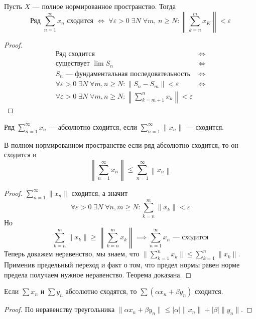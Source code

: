 \begin{theorem}
  Пусть $X$ --- полное нормированное пространство. Тогда
  \begin{equation*}
    \text{Ряд }\sum\limits_{n = 1}^{\infty} x_n\text{ сходится }\iff \; \forall \varepsilon > 0 \; \exists N \; \forall m,\, n \geq N\colon
    \left \|\sum\limits_{k = n}^{m} x_K \right \| < \varepsilon
  \end{equation*}
\end{theorem}
\begin{proof}
  \begin{align*}
    \text{Ряд сходится } &\iff \\
    \text{существует }\lim S_n &\iff \\
    S_n\text{ --- фундаментальная последовательность } &\iff \\
    \forall \varepsilon > 0 \; \exists N \; \forall m, n \geq N\colon \|S_n - S_m\| < \varepsilon &\iff \\
    \forall \varepsilon > 0 \; \exists N \; \forall m, n \geq N\colon
    \left\|\sum\limits_{k = m + 1}^{n} x_k\right\| < \varepsilon&
  \end{align*}
\end{proof}

\begin{conj}
  Ряд $\sum\limits_{n = 1}^{\infty} x_n$ --- абсолютно сходится, если
  $\sum\limits_{n = 1}^{\infty} \|x_n\|$ --- сходится.
\end{conj}

\begin{theorem}
  В полном нормированном пространстве если ряд абсолютно сходится, то он сходится и
  \begin{equation*}
    \left\|\sum\limits_{n = 1}^{\infty} x_n\right\| \leq
    \sum\limits_{n = 1}^{\infty}\left\|x_n\right\|
  \end{equation*}
\end{theorem}
\begin{proof}
  $\sum\limits_{n = 1}^{\infty}\|x_n\|$ сходится, а значит
  \begin{equation*}
    \forall \varepsilon > 0 \; \exists N \; \forall n, m \geq N\colon \sum\limits_{k = n}^{m} \|x_k\| < \varepsilon
  \end{equation*}
  Но
  \begin{equation*}
    \sum\limits_{k = n}^{m} \| x_k \| \geq \left\| \sum\limits_{k = n}^{m} x_k \right\| \implies
  \sum\limits_{n = 1}^{\infty} x_n\text{ --- сходится}
  \end{equation*}
  Теперь докажем неравенство, мы знаем, что $\Big \| \sum\limits_{k = 1}^{n} x_k \Big \| \leq \sum\limits_{k = 1}^{n} \| x_k \|$. Применив предельный переход и факт о том, что предел нормы равен норме предела получаем нужное неравенство. Теорема доказана.
\end{proof}

\begin{notice}
  Если $\sum x_n$ и $\sum y_n$ абсолютно сходятся, то $\sum(\alpha x_n + \beta y_n)$ сходится.
\end{notice}
\begin{proof}
  По неравенству треугольника $\| \alpha x_n + \beta y_n \| \leq | \alpha | \| x_n \| + | \beta | \| y_n \|$.
\end{proof}